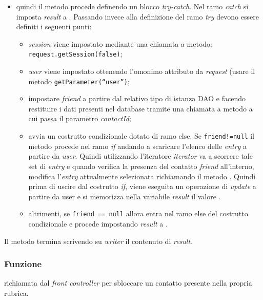 \begin{description}
\begin{itemize}
		\item quindi il metodo procede definendo un blocco \textit{try-catch}. Nel ramo \textit{catch} si imposta \textit{result} a . Passando invece alla definizione del ramo \textit{try} devono essere definiti i seguenti punti:
		\begin{itemize}
			\item \textit{session} viene impostato mediante una chiamata a metodo:
			\verb|request.getSession(false)|;
			\item \textit{user} viene impostato ottenendo l'omonimo attributo da \textit{request} (usare il metodo \texttt{getParameter(``user'')};
			\item impostare \textit{friend} a partire dal relativo tipo di istanza DAO e facendo restituire i dati presenti nel database tramite una chiamata a metodo  a cui passa il parametro \textit{contactId};
			\item avvia un costrutto condizionale dotato di ramo else. Se \texttt{friend!=null} il metodo procede nel ramo \textit{if} andando a scaricare l'elenco delle \textit{entry} a partire da \textit{user}. Quindi utilizzando l'iteratore \textit{iterator} va a scorrere tale set di \textit{entry} e quando verifica la presenza del contatto \textit{friend} all'interno, modifica l'\textit{entry} attualmente selezionata richiamando il metodo . Quindi prima di uscire dal costrutto \textit{if}, viene eseguita un operazione di \textit{update} a partire da user e si memorizza nella variabile \textit{result} il valore .
			\item altrimenti, se \texttt{friend == null} allora entra nel ramo else del costrutto condizionale e procede impostando \textit{result} a .
		\end{itemize}
	\end{itemize}
	Il metodo termina scrivendo su \textit{writer} il contenuto di \textit{result}.
	
\end{description}



\subsubsection*{Funzione}
 richiamata dal \textit{front controller} per sbloccare un contatto presente nella propria rubrica.

